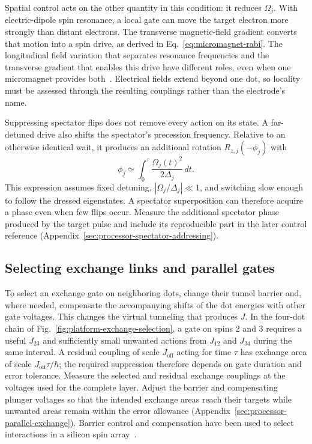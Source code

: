 Spatial control acts on the other quantity in this condition:
it reduces $\Omega_j$. With electric-dipole spin resonance, a
local gate can move the target electron more strongly than distant
electrons. The transverse magnetic-field gradient converts that
motion into a spin drive, as derived in
Eq.~\eqref{eq:micromagnet-rabi}. The longitudinal field variation
that separates resonance frequencies and the transverse gradient
that enables this drive have different roles, even when one
micromagnet provides both~\cite{Philips2022}. Electrical fields
extend beyond one dot, so locality must be assessed through the
resulting couplings rather than the electrode's name.

Suppressing spectator flips does not remove every action on its
state. A far-detuned drive also shifts the spectator's precession
frequency. Relative to an otherwise identical wait, it produces
an additional rotation $R_{z,j}(-\phi_j)$ with
\begin{equation}
 \phi_j\simeq\int_0^\tau\frac{\Omega_j(t)^2}{2\Delta_j}\,dt.
 \label{eq:platform-spectator-phase}
\end{equation}
This expression assumes fixed detuning, $|\Omega_j/\Delta_j|\ll1$,
and switching slow enough to follow the dressed eigenstates.
A spectator superposition can therefore acquire a phase even when
few flips occur. Measure the additional spectator phase produced by
the target pulse and include its reproducible part in the later
control reference (Appendix~\ref{sec:processor-spectator-addressing}).

\subsection{Selecting exchange links and parallel gates}

To select an exchange gate on neighboring dots, change their tunnel
barrier and, where needed, compensate the accompanying shifts of
the dot energies with other gate voltages. This changes the virtual
tunneling that produces $J$. In the four-dot chain of
Fig.~\ref{fig:platform-exchange-selection}, a gate on spins 2 and 3
requires a useful $J_{23}$ and sufficiently small unwanted actions
from $J_{12}$ and $J_{34}$ during the same interval. A residual
coupling of scale $J_{\mathrm{off}}$ acting for time $\tau$ has
exchange area of scale $J_{\mathrm{off}}\tau/\hbar$; the required
suppression therefore depends on gate duration and error tolerance.
Measure the selected and residual exchange couplings at the voltages
used for the complete layer. Adjust the barrier and compensating
plunger voltages so that the intended exchange areas reach their
targets while unwanted areas remain within the error allowance
(Appendix~\ref{sec:processor-parallel-exchange}).
Barrier control and compensation have been used to select
interactions in a silicon spin array~\cite{Philips2022}.

